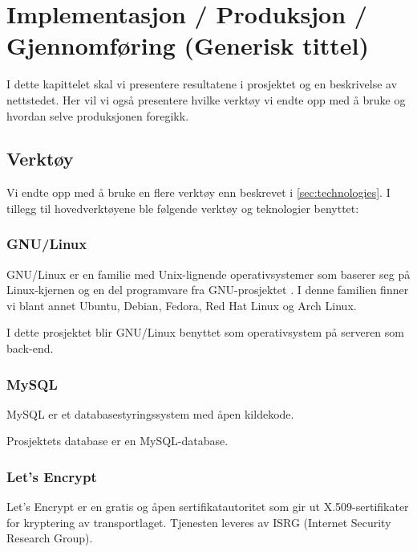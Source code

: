\cleardoublepage
\chapter{Implementasjon / Produksjon / Gjennomføring (Generisk tittel)}
\label{chap:implementation} 
\clearpage


I dette kapittelet skal vi presentere resultatene i prosjektet og en beskrivelse av nettstedet. Her vil vi også presentere hvilke verktøy vi endte opp med å bruke og hvordan selve produksjonen foregikk.

\section{Verktøy}
Vi endte opp med å bruke en flere verktøy enn beskrevet i  \ref{sec:technologies}. 
I tillegg til hovedverktøyene ble følgende verktøy og teknologier benyttet:

\subsection{GNU/Linux}
GNU/Linux er en familie med Unix-lignende operativsystemer som baserer seg på Linux-kjernen \cite{kernel_org} og en del programvare fra GNU-prosjektet \cite{gnu_org}. I denne familien finner vi blant annet Ubuntu, Debian, Fedora, Red Hat Linux og Arch Linux.

I dette prosjektet blir GNU/Linux benyttet som operativsystem på serveren som  back-end.

\subsection{MySQL}
MySQL \cite{oracle2019am} er et databasestyringssystem med åpen kildekode.

Prosjektets database er en MySQL-database.

\subsection{Let’s Encrypt}
Let’s Encrypt \cite{le2019ale} er en gratis og åpen sertifikatautoritet som gir ut X.509-sertifikater for kryptering av transportlaget. Tjenesten leveres av ISRG (Internet Security Research Group).

